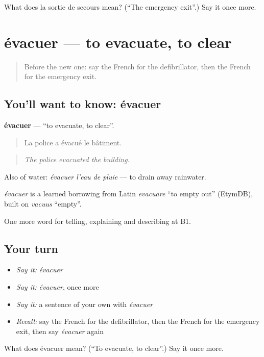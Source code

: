 \begin{tcolorbox}[breakable,colback=teal!4,colframe=teal!35!black,title={Before you move on}]
What does la sortie de secours mean? (\textquotedblleft{}The emergency exit\textquotedblright{}.) Say it once more.
\end{tcolorbox}
\section[évacuer]{évacuer — to evacuate, to clear}

\label{lesson:FR-C301-evacuer}



\begin{quote}
Before the new one: say the French for the defibrillator, then the French for the emergency exit.
\end{quote}

\subsection*{You'll want to know: évacuer}
\textbf{évacuer} — \textquotedblleft{}to evacuate, to clear\textquotedblright{}.

\begin{quote}
La police a évacué le bâtiment.
\end{quote}

\begin{quote}
\emph{The police evacuated the building.}
\end{quote}

Also of water: \emph{évacuer l'eau de pluie} — to drain away rainwater.

\begin{cousinweb}
\emph{évacuer} is a learned borrowing from Latin \emph{ēvacuāre} \textquotedblleft{}to empty out\textquotedblright{} (EtymDB), built on \emph{vacuus} \textquotedblleft{}empty\textquotedblright{}.
\end{cousinweb}

\begin{grammarlens}[title={What you've built}]
One more word for telling, explaining and describing at B1.
\end{grammarlens}

\subsection*{Your turn}
\begin{itemize}
\raggedright
  \item \emph{Say it:} \emph{évacuer}
  \item \emph{Say it:} \emph{évacuer}, once more
  \item \emph{Say it:} a sentence of your own with \emph{évacuer}
  \item \emph{Recall:} say the French for the defibrillator, then the French for the emergency exit, then say \emph{évacuer} again
\end{itemize}

\begin{tcolorbox}[breakable,colback=teal!4,colframe=teal!35!black,title={Before you move on}]
What does évacuer mean? (\textquotedblleft{}To evacuate, to clear\textquotedblright{}.) Say it once more.
\end{tcolorbox}
